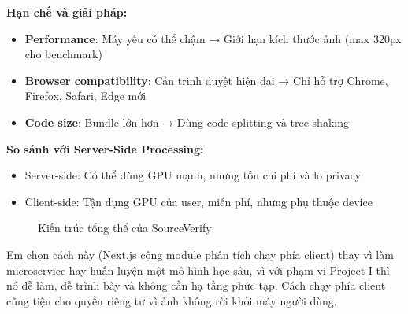 \documentclass[14pt,a4paper,oneside]{report}
\begin{document}
\textbf{Hạn chế và giải pháp:}
\begin{itemize}
  \item \textbf{Performance}: Máy yếu có thể chậm → Giới hạn kích thước ảnh (max 320px cho benchmark)
  \item \textbf{Browser compatibility}: Cần trình duyệt hiện đại → Chỉ hỗ trợ Chrome, Firefox, Safari, Edge mới
  \item \textbf{Code size}: Bundle lớn hơn → Dùng code splitting và tree shaking
\end{itemize}

\textbf{So sánh với Server-Side Processing:}
\begin{itemize}
  \item Server-side: Có thể dùng GPU mạnh, nhưng tốn chi phí và lo privacy
  \item Client-side: Tận dụng GPU của user, miễn phí, nhưng phụ thuộc device
\end{itemize}

\begin{figure}[H]
\centering
{}
\caption{Kiến trúc tổng thể của SourceVerify}
\label{fig:system-architecture}
\end{figure}

Em chọn cách này (Next.js cộng module phân tích chạy phía client) thay vì làm microservice hay huấn luyện một mô hình học sâu, vì với phạm vi Project I thì nó dễ làm, dễ trình bày và không cần hạ tầng phức tạp. Cách chạy phía client cũng tiện cho quyền riêng tư vì ảnh không rời khỏi máy người dùng.
\end{document}
